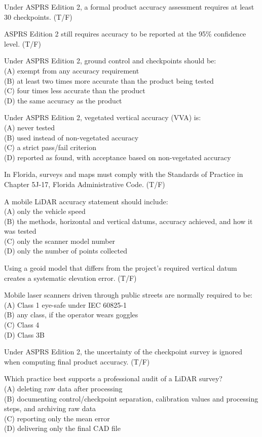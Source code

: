\item Under ASPRS Edition 2, a formal product accuracy assessment requires at least 30 checkpoints. (T/F)
\item ASPRS Edition 2 still requires accuracy to be reported at the 95\% confidence level. (T/F)
\item Under ASPRS Edition 2, ground control and checkpoints should be:\\[1pt] (A) exempt from any accuracy requirement\\ (B) at least two times more accurate than the product being tested\\ (C) four times less accurate than the product\\ (D) the same accuracy as the product
\item Under ASPRS Edition 2, vegetated vertical accuracy (VVA) is:\\[1pt] (A) never tested\\ (B) used instead of non-vegetated accuracy\\ (C) a strict pass/fail criterion\\ (D) reported as found, with acceptance based on non-vegetated accuracy
\item In Florida, surveys and maps must comply with the Standards of Practice in Chapter 5J-17, Florida Administrative Code. (T/F)
\item A mobile LiDAR accuracy statement should include:\\[1pt] (A) only the vehicle speed\\ (B) the methods, horizontal and vertical datums, accuracy achieved, and how it was tested\\ (C) only the scanner model number\\ (D) only the number of points collected
\item Using a geoid model that differs from the project's required vertical datum creates a systematic elevation error. (T/F)
\item Mobile laser scanners driven through public streets are normally required to be:\\[1pt] (A) Class 1 eye-safe under IEC 60825-1\\ (B) any class, if the operator wears goggles\\ (C) Class 4\\ (D) Class 3B
\item Under ASPRS Edition 2, the uncertainty of the checkpoint survey is ignored when computing final product accuracy. (T/F)
\item Which practice best supports a professional audit of a LiDAR survey?\\[1pt] (A) deleting raw data after processing\\ (B) documenting control/checkpoint separation, calibration values and processing steps, and archiving raw data\\ (C) reporting only the mean error\\ (D) delivering only the final CAD file